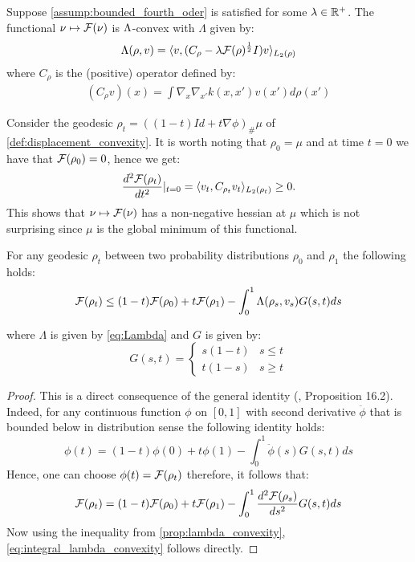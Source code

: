\begin{proposition}
\label{prop:lambda_convexity} Suppose \cref{assump:bounded_fourth_oder} is satisfied for some $\lambda \in {{\mathbb R}}^+$. The functional $\nu\mapsto {{\mathcal F}}(\nu)$ is $\text{\ensuremath{\Lambda}}$-convex
with $\Lambda$ given by:
\begin{equation}
\Lambda(\rho,v)=\langle v,(C_{\rho}-\lambda {{\mathcal F}}(\rho)^{\frac{1}{2}}I)v\rangle_{L_{2}(\rho)}\label{eq:Lambda}
\end{equation}
where $C_{\rho}$ is the (positive) operator defined by:
\begin{align}\label{eq:positive_operator_C}
	(C_{\rho}v)(x)=\int\nabla_{x}\nabla_{x'}k(x,x')v(x')d\rho(x')
\end{align}
\end{proposition}
%
%
Consider the geodesic $\rho_{t}=((1-t)Id+t\nabla\phi)_{\#}\mu$ of \cref{def:displacement_convexity}. It is worth noting that $\rho_{0}=\mu$ and at time $t=0$ we have
that ${{\mathcal F}}(\rho_{0})=0$, hence we get:
\[
\frac{d^{2}{{\mathcal F}}(\rho_{t})}{dt^{2}}\vert_{t=0}=\langle v_{t},C_{\rho_{t}}v_{t}\rangle_{L_{2}(\rho_{t})}\geq0.
\]
This shows that $\nu\mapsto {{\mathcal F}}(\nu)$ has a non-negative
hessian at $\mu$ which is not surprising since $\mu$ is the global
minimum of this functional.
\begin{corollary}\label{cor:integral_lambda_convexity}
For any geodesic $\rho_{t}$ between two probability distributions
$\rho_{0}$ and $\rho_{1}$ the following holds:
\begin{equation}
{{\mathcal F}}(\rho_{t})\leq(1-t){{\mathcal F}}(\rho_{0})+t{{\mathcal F}}(\rho_{1})-\int_{0}^{1}\Lambda(\rho_{s},v_{s})G(s,t)ds\label{eq:integral_lambda_convexity}
\end{equation}

where $\Lambda$ is given by \cref{eq:Lambda} and $G$ is given
by:
\[
G(s,t)=\begin{cases}
s(1-t) & s\leq t\\
t(1-s) & s\geq t
\end{cases}
\]
\end{corollary}
%
\begin{proof}
This is a direct consequence of the general identity (\cite{Villani:2009},
Proposition 16.2). Indeed, for any continuous function $\phi$ on
$[0,1]$ with second derivative $\ddot{\phi}$ that is bounded below
in distribution sense the following identity holds:
\[
\phi(t)=(1-t)\phi(0)+t\phi(1)-\int_{0}^{1}\ddot{\phi}(s)G(s,t)ds
\]
Hence, one can choose $\phi(t)={{\mathcal F}}(\rho_{t})$ therefore, 
it follows that:
\[
{{\mathcal F}}(\rho_{t})=(1-t){{\mathcal F}}(\rho_{0})+t{{\mathcal F}}(\rho_{1})-\int_{0}^{1}\frac{d^{2}{{\mathcal F}}(\rho_{s})}{ds^{2}}G(s,t)ds
\]
Now using the inequality from \cref{prop:lambda_convexity}, \cref{eq:integral_lambda_convexity}
follows directly. 
\end{proof}
